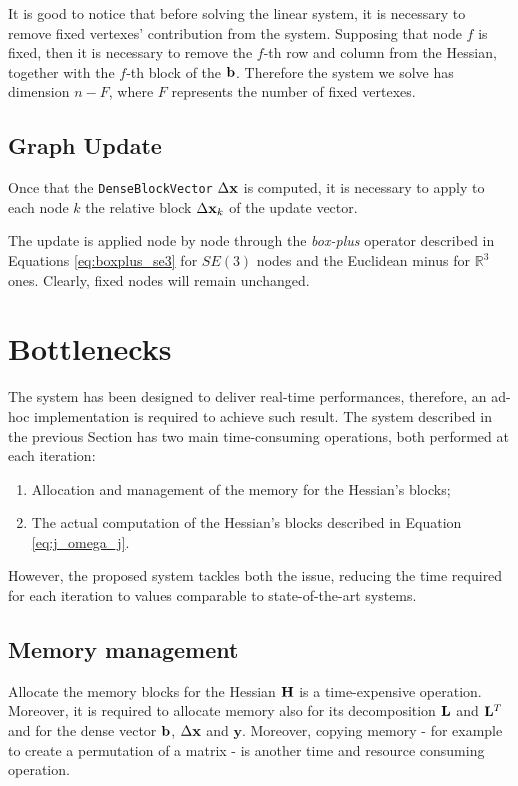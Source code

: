 It is good to notice that before solving the linear system, it is necessary to remove fixed vertexes' contribution from the system. Supposing that node $f$ is fixed, then it is necessary to remove the $f$-th row and column from the Hessian, together with the $f$-th block of the $\mathbf{b}$. Therefore the system we solve has dimension $n - F$, where $F$ represents the number of fixed vertexes.

\subsection{Graph Update}\label{subsec:update}
Once that the \texttt{DenseBlockVector} $\Delta \mathbf{x}$ is computed, it is necessary to apply to each node $k$ the relative block $\Delta \mathbf{x}_k$ of the update vector.

The update is applied node by node through the \textit{box-plus} operator described in Equations \ref{eq:boxplus_se3} for $SE(3)$ nodes and the Euclidean minus for $\mathbb{R}^3$ ones. Clearly, fixed nodes will remain unchanged. 

\section{Bottlenecks}\label{sec:bottlenecks}
The system has been designed to deliver real-time performances, therefore, an ad-hoc implementation is required to achieve such result. The system described in the previous Section has two main time-consuming operations, both performed at each iteration:

\begin{enumerate}
    \item Allocation and management of the memory for the Hessian's blocks;
    \item The actual computation of the Hessian's blocks described in Equation \ref{eq:j_omega_j}.
\end{enumerate}

However, the proposed system tackles both the issue, reducing the time required for each iteration to values comparable to state-of-the-art systems.

\subsection{Memory management}\label{subsec:memory_management}
Allocate the memory blocks for the Hessian $\mathbf{H}$ is a time-expensive operation. Moreover, it is required to allocate memory also for its decomposition $\mathbf{L}$ and $\mathbf{L}^T$ and for the dense vector $\mathbf{b}$, $\Delta \mathbf{x}$ and $\mathbf{y}$. Moreover, copying memory - for example to create a permutation of a matrix -  is another time and resource consuming operation. 

